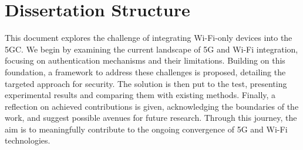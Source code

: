 \section{Dissertation Structure}

This document explores the challenge of integrating Wi-Fi-only devices into the \ac{5GC}. We begin by examining the current landscape of \ac{5G} and Wi-Fi integration, focusing on authentication mechanisms and their limitations. Building on this foundation, a framework to address these challenges is proposed, detailing the targeted approach for security. The solution is then put to the test, presenting experimental results and comparing them with existing methods. Finally, a reflection on achieved contributions is given, acknowledging the boundaries of the work, and suggest possible avenues for future research. Through this journey, the aim is to meaningfully contribute to the ongoing convergence of \ac{5G} and Wi-Fi technologies.